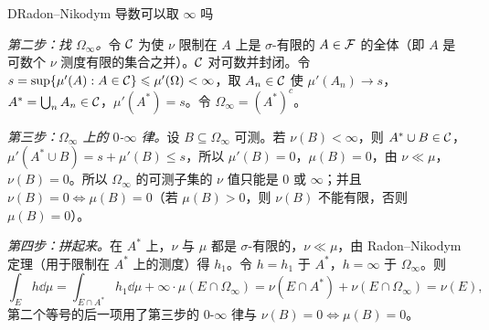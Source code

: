 \begin{probleme}[问题]{D}{Radon--Nikodym 导数可以取 \texorpdfstring{$\infty$}{∞} 吗}
\begin{questions}
\begin{solution}
\emph{第二步：找 $\Omega_\infty$。}令 $\mathcal{C}$ 为使 $\nu$ 限制在 $A$ 上是 $\sigma$-有限的 $A\in\mathcal{F}$ 的全体（即 $A$ 是可数个 $\nu$ 测度有限的集合之并）。$\mathcal{C}$ 对可数并封闭。令 $s=\sup\{\mu'(A):A\in\mathcal{C}\}\leqslant\mu'(\Omega)<\infty$，取 $A_n\in\mathcal{C}$ 使 $\mu'(A_n)\to s$，$A^*=\bigcup_nA_n\in\mathcal{C}$，$\mu'(A^*)=s$。令 $\Omega_\infty=(A^*)^c$。

\emph{第三步：$\Omega_\infty$ 上的 $0$-$\infty$ 律。}设 $B\subseteq\Omega_\infty$ 可测。若 $\nu(B)<\infty$，则 $A^*\cup B\in\mathcal{C}$，$\mu'(A^*\cup B)=s+\mu'(B)\leqslant s$，所以 $\mu'(B)=0$，$\mu(B)=0$，由 $\nu\ll\mu$，$\nu(B)=0$。所以 $\Omega_\infty$ 的可测子集的 $\nu$ 值只能是 $0$ 或 $\infty$；并且 $\nu(B)=0\iff\mu(B)=0$（若 $\mu(B)>0$，则 $\nu(B)$ 不能有限，否则 $\mu(B)=0$）。

\emph{第四步：拼起来。}在 $A^*$ 上，$\nu$ 与 $\mu$ 都是 $\sigma$-有限的，$\nu\ll\mu$，由 Radon--Nikodym 定理（用于限制在 $A^*$ 上的测度）得 $h_1$。令 $h=h_1$ 于 $A^*$，$h=\infty$ 于 $\Omega_\infty$。则
\[
\int_Eh\dd\mu=\int_{E\cap A^*}h_1\dd\mu+\infty\cdot\mu(E\cap\Omega_\infty)=\nu(E\cap A^*)+\nu(E\cap\Omega_\infty)=\nu(E),
\]
第二个等号的后一项用了第三步的 $0$-$\infty$ 律与 $\nu(B)=0\iff\mu(B)=0$。
\end{solution}
\end{questions}
\end{probleme}

